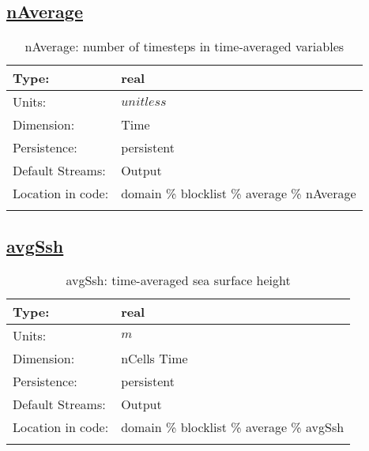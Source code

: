 \subsection[nAverage]{\hyperref[sec:var_tab_average]{nAverage}}
\label{subsec:var_sec_average_nAverage}
\begin{center}
\begin{longtable}{| p{2.0in} | p{4.0in} |}
        \hline 
        Type: & real \\
        \hline 
        Units: & $unitless$ \\
        \hline 
        Dimension: & Time \\
        \hline 
        Persistence: & persistent \\
        \hline 
		 Default Streams: & Output  \\
        \hline 
		 Location in code: & domain \% blocklist \% average \% nAverage \\
		 \hline 
    \caption{nAverage: number of timesteps in time-averaged variables}
\end{longtable}
\end{center}
\subsection[avgSsh]{\hyperref[sec:var_tab_average]{avgSsh}}
\label{subsec:var_sec_average_avgSsh}
\begin{center}
\begin{longtable}{| p{2.0in} | p{4.0in} |}
        \hline 
        Type: & real \\
        \hline 
        Units: & $m$ \\
        \hline 
        Dimension: & nCells Time \\
        \hline 
        Persistence: & persistent \\
        \hline 
		 Default Streams: & Output  \\
        \hline 
		 Location in code: & domain \% blocklist \% average \% avgSsh \\
		 \hline 
    \caption{avgSsh: time-averaged sea surface height}
\end{longtable}
\end{center}
